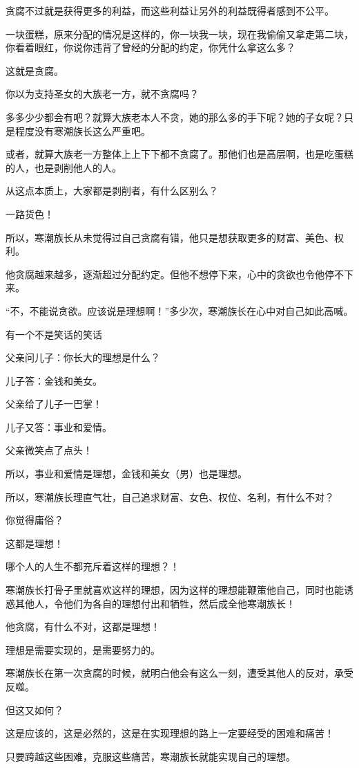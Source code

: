 \begin{this_body}
贪腐不过就是获得更多的利益，而这些利益让另外的利益既得者感到不公平。

一块蛋糕，原来分配的情况是这样的，你一块我一块，现在我偷偷又拿走第二块，你看着眼红，你说你违背了曾经的分配的约定，你凭什么拿这么多？

这就是贪腐。

你以为支持圣女的大族老一方，就不贪腐吗？

多多少少都会有吧？就算大族老本人不贪，她的那么多的手下呢？她的子女呢？只是程度没有寒潮族长这么严重吧。

或者，就算大族老一方整体上上下下都不贪腐了。那他们也是高层啊，也是吃蛋糕的人，也是剥削他人的人。

从这点本质上，大家都是剥削者，有什么区别么？

一路货色！

所以，寒潮族长从未觉得过自己贪腐有错，他只是想获取更多的财富、美色、权利。

他贪腐越来越多，逐渐超过分配约定。但他不想停下来，心中的贪欲也令他停不下来。

“不，不能说贪欲。应该说是理想啊！”多少次，寒潮族长在心中对自己如此高喊。

有一个不是笑话的笑话

父亲问儿子：你长大的理想是什么？

儿子答：金钱和美女。

父亲给了儿子一巴掌！

儿子又答：事业和爱情。

父亲微笑点了点头！

所以，事业和爱情是理想，金钱和美女（男）也是理想。

所以，寒潮族长理直气壮，自己追求财富、女色、权位、名利，有什么不对？

你觉得庸俗？

这都是理想！

哪个人的人生不都充斥着这样的理想？！

寒潮族长打骨子里就喜欢这样的理想，因为这样的理想能鞭策他自己，同时也能诱惑其他人，令他们为各自的理想付出和牺牲，然后成全他寒潮族长！

他贪腐，有什么不对，这都是理想！

理想是需要实现的，是需要努力的。

寒潮族长在第一次贪腐的时候，就明白他会有这么一刻，遭受其他人的反对，承受反噬。

但这又如何？

这是应该的，这是必然的，这是在实现理想的路上一定要经受的困难和痛苦！

只要跨越这些困难，克服这些痛苦，寒潮族长就能实现自己的理想。


\end{this_body}
